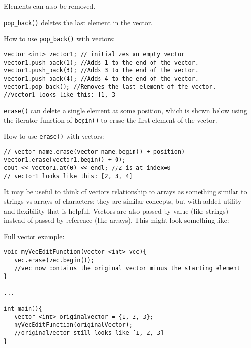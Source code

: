 Elements can also be removed.

\texttt{pop_back()} deletes the last element in the vector.

\begin{example}
    How to use \texttt{pop_back()} with vectors:
    \begin{verbatim}
vector <int> vector1; // initializes an empty vector
vector1.push_back(1); //Adds 1 to the end of the vector. 
vector1.push_back(3); //Adds 3 to the end of the vector. 
vector1.push_back(4); //Adds 4 to the end of the vector. 
vector1.pop_back(); //Removes the last element of the vector.
//vector1 looks like this: [1, 3]
    \end{verbatim}
\end{example}

\texttt{erase()} can delete a single element at some position, which is shown below using the iterator function of \texttt{begin()} to erase the first element of the vector.

\begin{example}
    How to use \texttt{erase()} with vectors:

    \begin{verbatim}
// vector_name.erase(vector_name.begin() + position)
vector1.erase(vector1.begin() + 0);
cout << vector1.at(0) << endl; //2 is at index=0
// vector1 looks like this: [2, 3, 4]
    \end{verbatim}
\end{example}

It may be useful to think of vectors relationship to arrays as something similar to strings vs arrays of characters; they are similar concepts, but with added utility and flexibility that is helpful. Vectors are also passed by value (like strings) instead of passed by reference (like arrays). This might look something like:

\begin{example}
    Full vector example:

    \begin{verbatim}
void myVecEditFunction(vector <int> vec){
   vec.erase(vec.begin());
   //vec now contains the original vector minus the starting element
}

...

int main(){
   vector <int> originalVector = {1, 2, 3};
   myVecEditFunction(originalVector);
   //originalVector still looks like [1, 2, 3]
}
    \end{verbatim}
\end{example}

